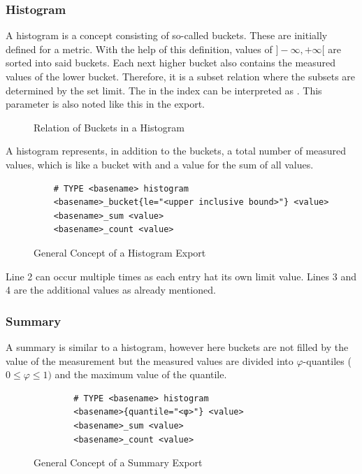 \subsubsection{Histogram}
A histogram is a concept consisting of so-called buckets. These are initially defined for a metric. With the help of this definition, values of $]-\infty,+\infty[$ are sorted into said buckets. Each next higher bucket also contains the measured values of the lower bucket. Therefore, it is a subset relation where the subsets are determined by the set limit. The  in the index can be interpreted as . This parameter is also noted like this in the export.
\begin{figure}[H]
	\caption{Relation of Buckets in a Histogram}
\end{figure}
A histogram represents, in addition to the buckets, a total number of measured values, which is like a bucket with  and a value for the sum of all values.
\begin{figure}[H]
	\begin{verbatim}
	# TYPE <basename> histogram
	<basename>_bucket{le="<upper inclusive bound>"} <value>
	<basename>_sum <value>
	<basename>_count <value>
	\end{verbatim}
	\caption{General Concept of a Histogram Export}
\end{figure}
Line 2 can occur multiple times as each entry hat its own limit value. Lines 3 and 4 are the additional values as already mentioned.
\subsubsection{Summary}
A summary is similar to a histogram, however here buckets are not filled by the value of the measurement but the measured values are divided into $\varphi$-quantiles ($0 \le \varphi \le 1)$ and the maximum value of the quantile.
\begin{figure}[H]
	\begin{verbatim}
		# TYPE <basename> histogram
		<basename>{quantile="<φ>"} <value>
		<basename>_sum <value>
		<basename>_count <value>
	\end{verbatim}
	\caption{General Concept of a Summary Export}
\end{figure}

